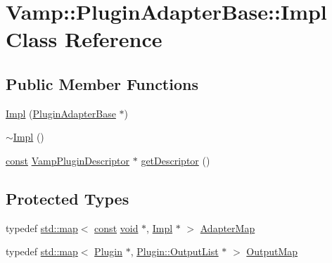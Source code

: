 \hypertarget{class_vamp_1_1_plugin_adapter_base_1_1_impl}{}\section{Vamp\+:\+:Plugin\+Adapter\+Base\+:\+:Impl Class Reference}
\label{class_vamp_1_1_plugin_adapter_base_1_1_impl}
\subsection*{Public Member Functions}
\begin{DoxyCompactItemize}
\item 
\hyperlink{class_vamp_1_1_plugin_adapter_base_1_1_impl_a9b5cff59377109e63b3894920205be9a}{Impl} (\hyperlink{class_vamp_1_1_plugin_adapter_base}{Plugin\+Adapter\+Base} $\ast$)
\item 
\hyperlink{class_vamp_1_1_plugin_adapter_base_1_1_impl_a75b00d5c8012db240fc410d18fd1235a}{$\sim$\+Impl} ()
\item 
\hyperlink{getopt1_8c_a2c212835823e3c54a8ab6d95c652660e}{const} \hyperlink{vamp_8h_aa1d6e0792099b9516a89b5fb7ed2ad2b}{Vamp\+Plugin\+Descriptor} $\ast$ \hyperlink{class_vamp_1_1_plugin_adapter_base_1_1_impl_a31d6c53c6ef9851782674f3e14bf891d}{get\+Descriptor} ()
\end{DoxyCompactItemize}
\subsection*{Protected Types}
\begin{DoxyCompactItemize}
\item 
typedef \hyperlink{xllist_8c_a03a3bd19ed9a28af3660a6c7b77249c2}{std\+::map}$<$ \hyperlink{getopt1_8c_a2c212835823e3c54a8ab6d95c652660e}{const} \hyperlink{sound_8c_ae35f5844602719cf66324f4de2a658b3}{void} $\ast$, \hyperlink{class_vamp_1_1_plugin_adapter_base_1_1_impl}{Impl} $\ast$ $>$ \hyperlink{class_vamp_1_1_plugin_adapter_base_1_1_impl_a6c8f2c8fce370d586785353c939601d5}{Adapter\+Map}
\item 
typedef \hyperlink{xllist_8c_a03a3bd19ed9a28af3660a6c7b77249c2}{std\+::map}$<$ \hyperlink{class_vamp_1_1_plugin}{Plugin} $\ast$, \hyperlink{class_vamp_1_1_plugin_a30f531b8fb69fac41a24e3d2a6a08ed9}{Plugin\+::\+Output\+List} $\ast$ $>$ \hyperlink{class_vamp_1_1_plugin_adapter_base_1_1_impl_afd448b66d5973d8e14ec592dabcbbd2d}{Output\+Map}
\end{DoxyCompactItemize}

